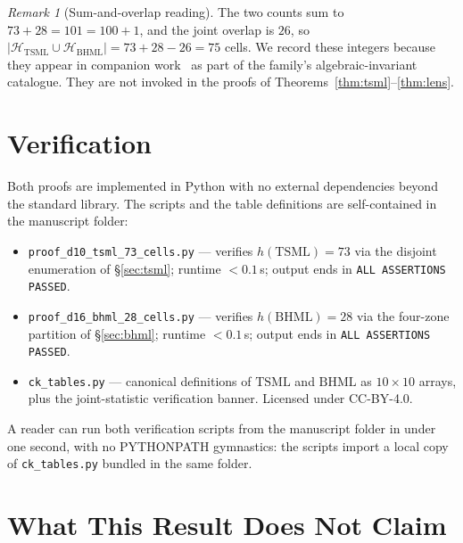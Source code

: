 \documentclass[11pt,reqno]{amsart}
\theoremstyle{plain}
\theoremstyle{definition}
\theoremstyle{remark}
\newtheorem*{remark}{Remark}
\newcommand{\TSML}{\mathrm{TSML}}
\newcommand{\BHML}{\mathrm{BHML}}
\begin{document}
\begin{remark}[Sum-and-overlap reading]
The two counts sum to $73 + 28 = 101 = 100 + 1$, and the joint
overlap is $26$, so $|\mathcal{H}_{\TSML} \cup \mathcal{H}_{\BHML}|
= 73 + 28 - 26 = 75$ cells. We record these integers because they
appear in companion work~\cite{FourCore} as part of the family's
algebraic-invariant catalogue. They are not invoked in the proofs
of Theorems~\ref{thm:tsml}--\ref{thm:lens}.
\end{remark}

\section{Verification}\label{sec:verify}

Both proofs are implemented in Python with no external
dependencies beyond the standard library. The scripts and the
table definitions are self-contained in the manuscript folder:

\begin{itemize}\setlength\itemsep{2pt}
\item \texttt{proof\_d10\_tsml\_73\_cells.py} — verifies
$h(\TSML) = 73$ via the disjoint enumeration of
\S\ref{sec:tsml}; runtime $< 0.1$\,s; output ends in
\texttt{ALL ASSERTIONS PASSED}.
\item \texttt{proof\_d16\_bhml\_28\_cells.py} — verifies
$h(\BHML) = 28$ via the four-zone partition of
\S\ref{sec:bhml}; runtime $< 0.1$\,s; output ends in
\texttt{ALL ASSERTIONS PASSED}.
\item \texttt{ck\_tables.py} — canonical definitions of $\TSML$
and $\BHML$ as $10 \times 10$ arrays, plus the joint-statistic
verification banner. Licensed under CC-BY-4.0.
\end{itemize}

A reader can run both verification scripts from the manuscript
folder in under one second, with no PYTHONPATH gymnastics: the
scripts import a local copy of \texttt{ck\_tables.py} bundled in
the same folder.

\section{What This Result Does Not Claim}\label{sec:limits}
\end{document}

